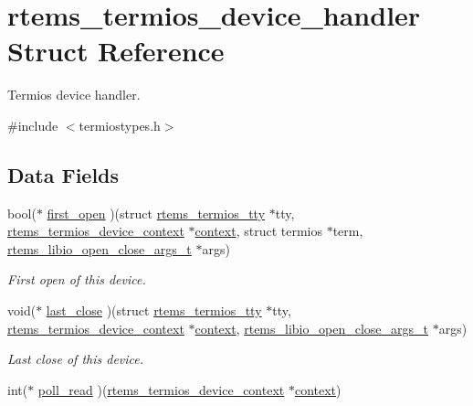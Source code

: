 \hypertarget{structrtems__termios__device__handler}{}\section{rtems\+\_\+termios\+\_\+device\+\_\+handler Struct Reference}
\label{structrtems__termios__device__handler}


Termios device handler.  




{\ttfamily \#include $<$termiostypes.\+h$>$}

\subsection*{Data Fields}
\begin{DoxyCompactItemize}
\item 
bool($\ast$ \mbox{\hyperlink{structrtems__termios__device__handler_a7067d4e46d2b8f269256c127a939ed63}{first\+\_\+open}} )(struct \mbox{\hyperlink{structrtems__termios__tty}{rtems\+\_\+termios\+\_\+tty}} $\ast$tty, \mbox{\hyperlink{structrtems__termios__device__context}{rtems\+\_\+termios\+\_\+device\+\_\+context}} $\ast$\mbox{\hyperlink{sun4u_2tte_8h_a9b4a99475e2709333b8e5d70483173f1}{context}}, struct termios $\ast$term, \mbox{\hyperlink{structrtems__libio__open__close__args__t}{rtems\+\_\+libio\+\_\+open\+\_\+close\+\_\+args\+\_\+t}} $\ast$args)
\begin{DoxyCompactList}\small\item\em First open of this device. \end{DoxyCompactList}\item 
void($\ast$ \mbox{\hyperlink{structrtems__termios__device__handler_a8790f0e2655226a4cb4c4e87a2c0ba29}{last\+\_\+close}} )(struct \mbox{\hyperlink{structrtems__termios__tty}{rtems\+\_\+termios\+\_\+tty}} $\ast$tty, \mbox{\hyperlink{structrtems__termios__device__context}{rtems\+\_\+termios\+\_\+device\+\_\+context}} $\ast$\mbox{\hyperlink{sun4u_2tte_8h_a9b4a99475e2709333b8e5d70483173f1}{context}}, \mbox{\hyperlink{structrtems__libio__open__close__args__t}{rtems\+\_\+libio\+\_\+open\+\_\+close\+\_\+args\+\_\+t}} $\ast$args)
\begin{DoxyCompactList}\small\item\em Last close of this device. \end{DoxyCompactList}\item 
int($\ast$ \mbox{\hyperlink{structrtems__termios__device__handler_a66c5558c661f59677e3e3d0739457aed}{poll\+\_\+read}} )(\mbox{\hyperlink{structrtems__termios__device__context}{rtems\+\_\+termios\+\_\+device\+\_\+context}} $\ast$\mbox{\hyperlink{sun4u_2tte_8h_a9b4a99475e2709333b8e5d70483173f1}{context}})

\end{DoxyCompactItemize}
